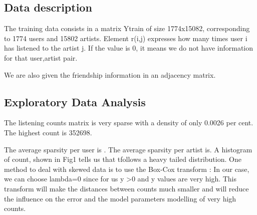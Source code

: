 \subsection{Data description}
The training data consists in a matrix Ytrain of size 1774x15082, corresponding to 1774 users 
and 15802 artists. Element r(i,j) expresses how many times user i has listened to the artist j.
If the value is 0, it means we do not have information for that user,artist pair.

We are also given the friendship information in an adjacency matrix.

\subsection{Exploratory Data Analysis}

The listening counts matrix is very sparse with a density of only 0.0026 per cent.
The highest count is 352698.

The average sparsity per user is . The average sparsity per artist is.
A histogram of count, shown in Fig1 tells us that tfollows a heavy tailed distribution.
One method to deal with skewed data is to use the Box-Cox transform :
In our case, we can choose lambda=0 since for us y >0 and y values are very high. 
This transform will make the distances between counts much smaller and will reduce the influence on the error and the model parameters modelling of very high counts.


